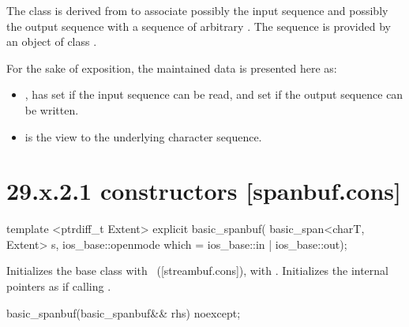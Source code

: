 \documentclass[ebook,11pt,article]{memoir}
\renewcommand{\iref}[1]{[#1]}
\begin{document}
\pnum
The class
is derived from
to associate possibly the input sequence and possibly
the output sequence with a sequence of arbitrary
.
The sequence is provided by an object of class
.

\pnum
For the sake of exposition, the maintained data is presented here as:
\begin{itemize}
\item
{},
has
set if the input sequence can be read, and
set if the output sequence can be written.
\item
{}
is the view to the underlying character sequence.
\end{itemize}

\section{29.x.2.1  constructors [spanbuf.cons]}

%
\begin{itemdecl}
template <ptrdiff_t Extent>
explicit basic_spanbuf(
  basic_span<charT, Extent> s,
  ios_base::openmode which = ios_base::in | ios_base::out);
\end{itemdecl}

\begin{itemdescr}
\pnum
\effects
Initializes the base class with
~(\iref{streambuf.cons}),
with . 
Initializes the internal pointers as if calling .
\end{itemdescr}

%
\begin{itemdecl}
basic_spanbuf(basic_spanbuf&& rhs) noexcept;
\end{itemdecl}
\end{document}
